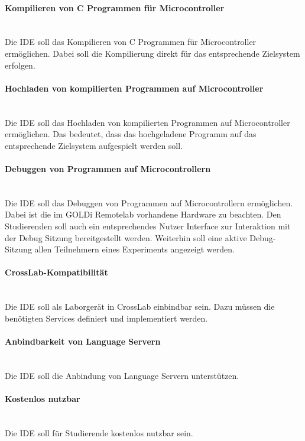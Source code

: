 \paragraph{Kompilieren von C Programmen für Microcontroller} \mbox{} \\
Die IDE soll das Kompilieren von C Programmen für Microcontroller ermöglichen. Dabei soll die Kompilierung direkt für das entsprechende Zielsystem erfolgen.

\paragraph{Hochladen von kompilierten Programmen auf Microcontroller} \mbox{} \\
Die IDE soll das Hochladen von kompilierten Programmen auf Microcontroller ermöglichen. Das bedeutet, dass das hochgeladene Programm auf das entsprechende Zielsystem aufgespielt werden soll.

\paragraph{Debuggen von Programmen auf Microcontrollern} \mbox{} \\
Die IDE soll das Debuggen von Programmen auf Microcontrollern ermöglichen. Dabei ist die im GOLDi Remotelab vorhandene Hardware zu beachten. Den Studierenden soll auch ein entsprechendes Nutzer Interface zur Interaktion mit der Debug Sitzung bereitgestellt werden. Weiterhin soll eine aktive Debug-Sitzung allen Teilnehmern eines Experiments angezeigt werden.

\paragraph{CrossLab-Kompatibilität} \mbox{} \\
Die IDE soll als Laborgerät in CrossLab einbindbar sein. Dazu müssen die benötigten Services definiert und implementiert werden.

\paragraph{Anbindbarkeit von Language Servern} \mbox{} \\
Die IDE soll die Anbindung von Language Servern unterstützen.

\paragraph{Kostenlos nutzbar} \mbox{} \\
Die IDE soll für Studierende kostenlos nutzbar sein.

